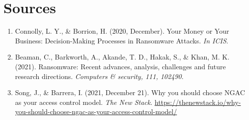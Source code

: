 \documentclass[11pt]{article}
\begin{document}
\section{Sources}
\label{sec:orga48a017}
\begin{enumerate}
\item Connolly, L. Y., \& Borrion, H. (2020, December). Your Money or Your Business: Decision-Making Processes in Ransomware Attacks. \emph{In ICIS}.
\item Beaman, C., Barkworth, A., Akande, T. D., Hakak, S., \& Khan, M. K. (2021). Ransomware: Recent advances, analysis, challenges and future research directions. \emph{Computers \& security, 111, 102490}.
\item Song, J., \& Barrera, I. (2021, December 21). Why you should choose NGAC as your access control model. \emph{The New Stack}. \url{https://thenewstack.io/why-you-should-choose-ngac-as-your-access-control-model/}
\end{enumerate}
\end{document}

